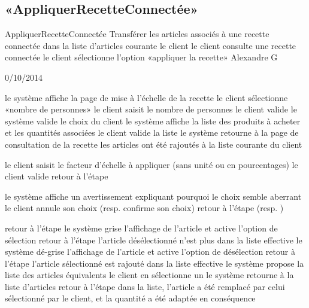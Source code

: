 \subsection{«AppliquerRecetteConnectée»}

\startCU
\nom AppliquerRecetteConnectée
\but Transférer les articles associés à une recette connectée dans la liste d'articles courante
\acteur le client
\precondition le client consulte une recette connectée 
\declenchement le client sélectionne l'option «appliquer la recette»
\auteur Alexandre G
\date 30/10/2014

\nominal %
\startnominal
{} le système affiche la page de mise à l'échelle de la recette
 le client sélectionne «nombre de personnes» 
\etape le client saisit le nombre de personnes
\etape le client valide
 le système valide le choix du client
 le système affiche la liste des produits à acheter et les quantités associées
 le client valide la liste
\etape le système retourne à la page de consultation de la recette
\stopnominal
\postcondition les articles ont été rajoutés à la liste courante du client

\alternatifs 
{} 
  \etape le client saisit le facteur d'échelle à appliquer (sans unité ou en pourcentages)
  \etape le client valide
  \etape retour à l'étape 
\stopcondition
\stopalternatif

  \etape le système affiche un avertissement expliquant pourquoi le choix semble aberrant
  \etape le client annule son choix (resp. confirme son choix)
  \etape retour à l'étape  (resp. )
\stopcondition
\stopalternatif

  \etape retour à l'étape 
\stopcondition
{} 
  \etape le système grise l'affichage de l'article et active l'option de sélection
  \etape retour à l'étape 
\stopcondition
\postcondition l'article désélectionné n'est plus dans la liste effective
  \etape le système dé-grise l'affichage de l'article et active l'option de désélection
  \etape retour à l'étape 
\stopcondition
\postcondition l'article sélectionné est rajouté dans la liste effective
  \etape le système propose la liste des articles équivalents
  \etape le client en sélectionne un
  \etape le système retourne à la liste d'articles
  \etape retour à l'étape 
\stopcondition
\postcondition dans la liste, l'article a été remplacé par celui sélectionné par le client, et la quantité a été adaptée en conséquence
\stopalternatif

